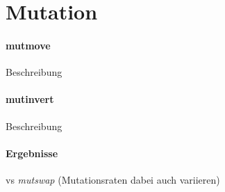 \section{Mutation}\label{mutation}


\paragraph{mutmove}
Beschreibung

\paragraph{mutinvert}
Beschreibung

\paragraph{Ergebnisse}
vs \emph{mutswap} (Mutationsraten dabei auch variieren)

